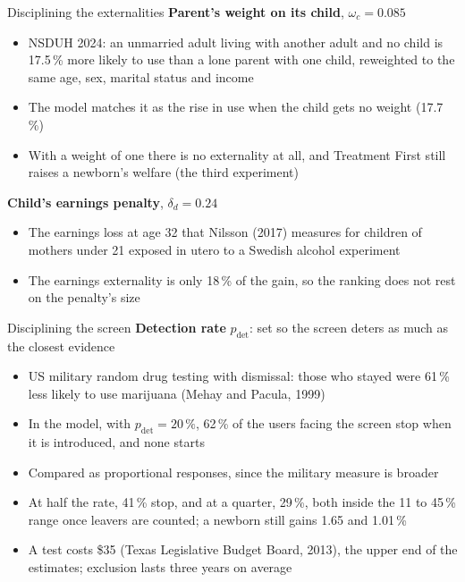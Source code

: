 \documentclass[aspectratio=169,11pt]{beamer}
\newcommand{\TF}{Treatment First}
\newcommand{\pc}{\,\%}
\begin{document}
\begin{frame}{Disciplining the externalities}
\textbf{Parent's weight on its child}, $\omega_c=0.085$
\begin{itemize}
\item NSDUH 2024: an unmarried adult living with another adult and no child is 17.5\pc{} more likely to use than a lone parent with one child, reweighted to the same age, sex, marital status and income
\item The model matches it as the rise in use when the child gets no weight (17.7\pc)
\item With a weight of one there is no externality at all, and \TF{} still raises a newborn's welfare (the third experiment)
\end{itemize}
\vspace{0.2cm}
\textbf{Child's earnings penalty}, $\delta_d=0.24$
\begin{itemize}
\item The earnings loss at age 32 that Nilsson (2017) measures for children of mothers under 21 exposed in utero to a Swedish alcohol experiment
\item The earnings externality is only 18\pc{} of the gain, so the ranking does not rest on the penalty's size
\end{itemize}
\end{frame}

\begin{frame}{Disciplining the screen}
\textbf{Detection rate} $p_{\text{det}}$: set so the screen deters as much as the closest evidence
\begin{itemize}\setlength\itemsep{0.4em}
\item US military random drug testing with dismissal: those who stayed were 61\pc{} less likely to use marijuana (Mehay and Pacula, 1999)
\item In the model, with $p_{\text{det}}=20\pc$, 62\pc{} of the users facing the screen stop when it is introduced, and none starts
\item Compared as proportional responses, since the military measure is broader
\item At half the rate, 41\pc{} stop, and at a quarter, 29\pc, both inside the 11 to 45\pc{} range once leavers are counted; a newborn still gains 1.65 and 1.01\pc
\item A test costs \$35 (Texas Legislative Budget Board, 2013), the upper end of the estimates; exclusion lasts three years on average
\end{itemize}
\end{frame}
\end{document}
